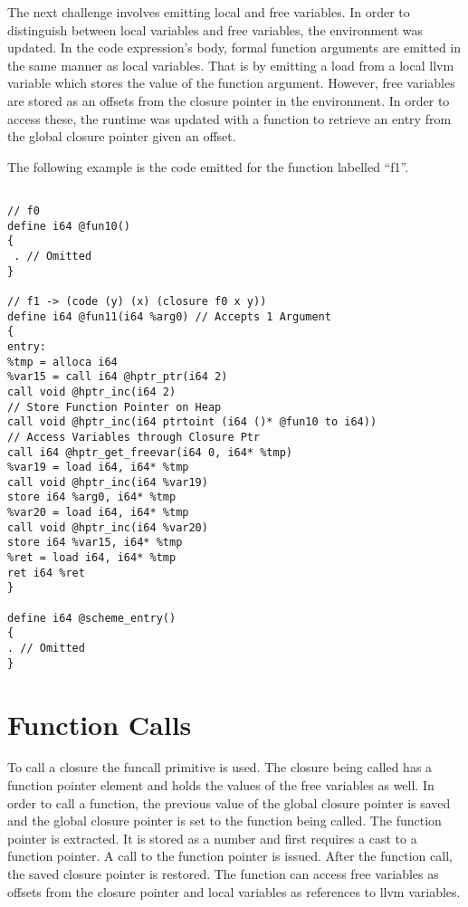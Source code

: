 \documentclass{article}
\begin{document}
The next challenge involves emitting local and free variables. In order to distinguish between local variables and free variables, the environment was updated. In the code expression's body, formal function arguments are emitted in the same manner as local variables. That is by emitting a load from a local llvm variable which stores the value of the function argument. However, free variables are stored as an offsets from the closure pointer in the environment. In order to access these, the runtime was updated with a function to retrieve an entry from the global closure pointer given an offset.

The following example is the code emitted for the function labelled ``f1''. 

\begingroup
    \fontsize{8pt}{5pt}\selectfont
\begin{verbatim}

// f0
define i64 @fun10() 
{
 . // Omitted
}
 
// f1 -> (code (y) (x) (closure f0 x y)) 
define i64 @fun11(i64 %arg0) // Accepts 1 Argument
{
entry: 
%tmp = alloca i64
%var15 = call i64 @hptr_ptr(i64 2)
call void @hptr_inc(i64 2)
// Store Function Pointer on Heap
call void @hptr_inc(i64 ptrtoint (i64 ()* @fun10 to i64))
// Access Variables through Closure Ptr
call i64 @hptr_get_freevar(i64 0, i64* %tmp) 
%var19 = load i64, i64* %tmp
call void @hptr_inc(i64 %var19)
store i64 %arg0, i64* %tmp
%var20 = load i64, i64* %tmp
call void @hptr_inc(i64 %var20)
store i64 %var15, i64* %tmp
%ret = load i64, i64* %tmp
ret i64 %ret
}

define i64 @scheme_entry()
{
. // Omitted
}
\end{verbatim}
\endgroup


\section{Function Calls}


To call a closure the funcall primitive is used. The closure being called has a function pointer element and holds the values of the free variables as well. In order to call a function, the previous value of the global closure pointer is saved and the global closure pointer is set to the function being called. The function pointer is extracted. It is stored as a number and first requires a cast to a function pointer. A call to the function pointer is issued. After the function call, the saved closure pointer is restored. The function can access free variables as offsets from the closure pointer and local variables as references to llvm variables.
\end{document}
